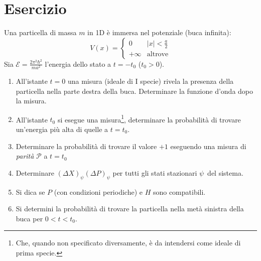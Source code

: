 \documentclass[../../FisicaTeorica.tex]{subfiles}
\begin{document}
\section{Esercizio \theEsercizio} 
Una particella di massa $m$ in 1D è immersa nel potenziale (buca infinita):
\[
V(x)=\begin{cases}
0 & |x|<\frac{a}{2}\\
+\infty & \text{altrove}
\end{cases}
\]
Sia $\mathcal{E}=\frac{2\pi^2\hbar^2}{ma^2}$ l'energia dello stato a $t=-t_0$ ($t_0>0$).
\begin{enumerate}
\item All'istante $t=0$ una misura (ideale di I specie) rivela la presenza della particella nella parte destra della buca. Determinare la funzione d'onda dopo la misura.
\item All'istante $t_0$ si esegue una misura\footnote{Che, quando non specificato diversamente, è da intendersi come ideale di prima specie.}, determinare la probabilità di trovare un'energia più alta di quelle a $t=t_0$.
\item Determinare la probabilità di trovare il valore $+1$ eseguendo una misura di \textit{parità} $\mathcal{P}$ a $t=t_0$
\item Determinare $(\Delta X)_{\psi}(\Delta P)_\psi$ per tutti gli stati stazionari $\psi$\ del sistema.
\item Si dica se $P$ (con condizioni periodiche) e $H$ sono compatibili.
\item Si determini la probabilità di trovare la particella nella metà sinistra della buca per $0<t<t_0$.
\end{enumerate}
\end{document}
